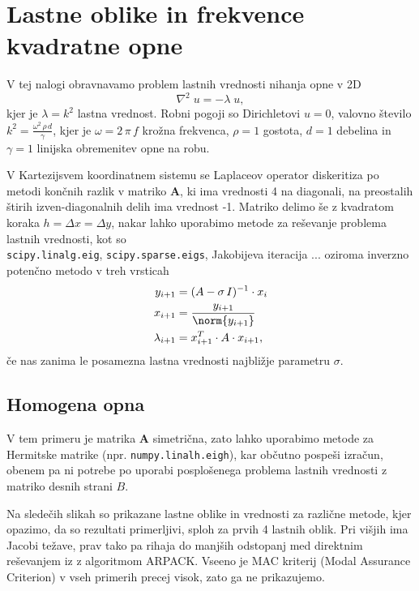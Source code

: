 \section{Lastne oblike in frekvence kvadratne opne}

V tej nalogi obravnavamo problem lastnih vrednosti nihanja opne v 2D
\begin{equation}
    \nabla^2\;u = -\lambda\;u,
\end{equation}
kjer je $\lambda=k^2$ lastna vrednost. Robni pogoji so Dirichletovi $u=0$, valovno število $k^2=\frac{\omega^2\,\rho\,d}{\gamma}$, kjer je $\omega=2\,\pi\,f$ krožna frekvenca, $\rho=1$ gostota, $d=1$ debelina in $\gamma=1$ linijska obremenitev opne na robu.

V Kartezijsvem koordinatnem sistemu se Laplaceov operator diskeritiza po metodi končnih razlik v matriko $\mathbf{A}$, ki ima vrednosti 4 na diagonali, na preostalih štirih izven-diagonalnih delih ima vrednost -1. Matriko delimo še z kvadratom koraka $h=\Delta x=\Delta y$, nakar lahko uporabimo metode za reševanje problema lastnih vrednosti, kot so \\\texttt{scipy.linalg.eig}, \texttt{scipy.sparse.eigs}, Jakobijeva iteracija ... oziroma inverzno potenčno metodo v treh vrsticah
\begin{align}
    y_{i+1} &= (A-\sigma\,I)^{-1}\cdot x_i\\\nonumber
    x_{i+1} &= \frac{y_{i+1}}{\norm{y_{i+1}}}\\\nonumber
    \lambda_{i+1} &= x_{i+1}^T\cdot A\cdot x_{i+1},
\end{align}
če nas zanima le posamezna lastna vrednosti najbližje parametru $\sigma$.

\subsection{Homogena opna}

V tem primeru je matrika $\mathbf{A}$ simetrična, zato lahko uporabimo metode za Hermitske matrike (npr. \texttt{numpy.linalh.eigh}), kar občutno pospeši izračun, obenem pa ni potrebe po uporabi posplošenega problema lastnih vrednosti z matriko desnih strani $B$.

Na sledečih slikah so prikazane lastne oblike in vrednosti za različne metode, kjer opazimo, da so rezultati primerljivi, sploh za prvih 4 lastnih oblik. Pri višjih ima Jacobi težave, prav tako pa rihaja do manjših odstopanj med direktnim reševanjem iz z algoritmom ARPACK. Vseeno je MAC kriterij (Modal Assurance Criterion) v vseh primerih precej visok, zato ga ne prikazujemo.

